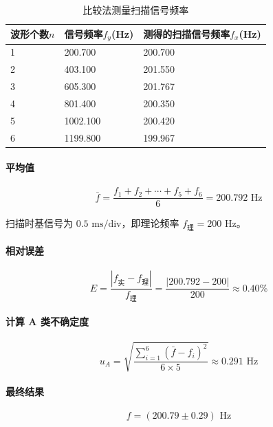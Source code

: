 \documentclass[]{../../templates/Report}%
\begin{document}
\begin{table}[H]
\centering
\caption{比较法测量扫描信号频率}
\label{tab:freq}
\begin{tabular}{|l|l|l|}
\hline
波形个数$n$ & 信号频率$f_y$(\si{\hertz}) & 测得的扫描信号频率$f_x$(\si{\hertz}) \\ \hline
1       & 200.700                & 200.700       \\ \hline
2       & 403.100                & 201.550        \\ \hline
3       & 605.300                & 201.767        \\ \hline
4       & 801.400               & 200.350        \\ \hline
5       & 1002.100                &200.420        \\ \hline
6       & 1199.800               & 199.967        \\ \hline
\end{tabular}
\end{table}
\paragraph{平均值}
\begin{equation*}
    \bar{f} = \frac{f_1 + f_2 + \cdots + f_5 + f_6}{6} = 200.792 \text{ Hz}
\end{equation*}

扫描时基信号为 $0.5 \text{ ms/div}$，即理论频率 $f_{\text{理}} = 200 \text{ Hz}$。

\paragraph{相对误差}
\begin{equation*}
    E = \frac{|f_{\text{实}} - f_{\text{理}}|}{f_{\text{理}}} = \frac{|200.792 - 200|}{200} \approx 0.40\%
\end{equation*}

\paragraph{计算 A 类不确定度}
\begin{equation*}
    u_A = \sqrt{\frac{\sum_{i=1}^{6} (\bar{f} - f_i)^2}{6 \times 5}} \approx 0.291 \text{ Hz}
\end{equation*}

\paragraph{最终结果}
\begin{equation*}
    f = (200.79 \pm 0.29) \text{ Hz}
\end{equation*}
\end{document}

